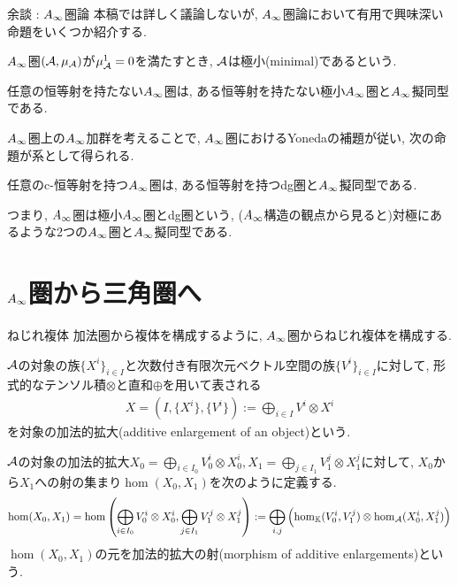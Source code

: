 \documentclass[aspectratio=169, dvipdfmx, 8pt, notheorems, uplatex]{beamer}
\begin{document}
\begin{frame}{余談 : $A_\infty$圏論}
  本稿では詳しく議論しないが, $A_\infty$圏論において有用で興味深い命題をいくつか紹介する. 

  \begin{definition}[極小]
    $A_\infty$圏$(\mathcal{A},\mu_{\mathcal{A}})$が$\mu^1_{\mathcal{A}}=0$を満たすとき, $\mathcal{A}$は極小(minimal)であるという.
  \end{definition} 

  \begin{theorem}[極小模型定理] \label{prop_minimal_model_theorem}
    任意の恒等射を持たない$A_\infty$圏は, ある恒等射を持たない極小$A_\infty$圏と$A_\infty$擬同型である. 
  \end{theorem} 

  $A_\infty$圏上の$A_\infty$加群を考えることで, $A_\infty$圏におけるYonedaの補題が従い, 次の命題が系として得られる. 

  \begin{corollary} \label{prop_Ainf_Yoneda_ver0}
    任意のc-恒等射を持つ$A_\infty$圏は, ある恒等射を持つdg圏と$A_\infty$擬同型である. 
  \end{corollary}

  つまり, $A_\infty$圏は極小$A_\infty$圏とdg圏という, ($A_\infty$構造の観点から見ると)対極にあるような2つの$A_\infty$圏と$A_\infty$擬同型である. 
\end{frame}


\section{$A_\infty$圏から三角圏へ}

\begin{frame}{ねじれ複体}
  加法圏から複体を構成するように, $A_\infty$圏からねじれ複体を構成する. 

  \begin{definition}[対象の加法的拡大]
    $\mathcal{A}$の対象の族$\{X^i\}_{i \in I}$と次数付き有限次元ベクトル空間の族$\{V^i\}_{i \in I}$に対して, 形式的なテンソル積$\otimes$と直和$\oplus$を用いて表される
    \begin{align*}
      X = (I,\{X^i\},\{V^i\}) := \bigoplus_{i \in I} V^i \otimes X^i
    \end{align*}
    を対象の加法的拡大(additive enlargement of an object)という. 
  \end{definition} 

  \begin{definition}[加法的拡大の射]
    $\mathcal{A}$の対象の加法的拡大$X_0 = \bigoplus_{i \in I_0} V_0^i \otimes X_0^i, X_1 = \bigoplus_{j \in I_1} V_1^j \otimes X_1^j$に対して, $X_0$から$X_1$への射の集まり$\hom(X_0,X_1)$を次のように定義する. 
    \begin{align*}
      \hom (X_0,X_1) 
      = \hom \qty(\bigoplus_{i \in I_0} V_0^i \otimes X_0^i, \bigoplus_{j \in I_1} V_1^j \otimes X_1^j) 
      := \bigoplus_{i,j} \qty(\hom_{\mathbb{K}}(V_0^i,V_1^j) \otimes \hom_{\mathcal{A}}(X_0^i,X_1^j))
    \end{align*}
    $\hom (X_0,X_1)$の元を加法的拡大の射(morphism of additive enlargements)という. 
  \end{definition}
\end{frame}
\end{document}
